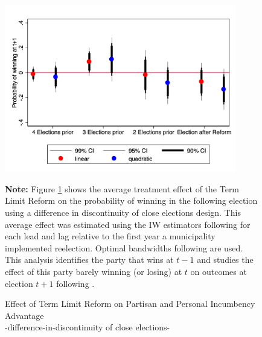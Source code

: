 \documentclass[12pt]{amsart}
\numberwithin{equation}{section}
\theoremstyle{definition}
\theoremstyle{definition}
\theoremstyle{definition}
\begin{document}
 \begin{figure}[H]   
\centering
 \caption{Effect of Term Limit Reform on Partisan and Personal Incumbency Advantage \\ -difference-in-discontinuity of close elections-}
 \label{fig:parallel_trend}
\includegraphics[width=0.9\textwidth]{../Figures/parallel_trends_incumbency.png}
       \captionsetup{justification=centering}
         
 \textbf{Note:} Figure \ref{fig:parallel_trend} shows the average treatment effect of the Term Limit Reform on the probability of winning in the following election using a difference in discontinuity of close elections design. This average effect was estimated using the IW estimators following \citet{abraham_sun_2020} for each lead and lag relative to the first year a municipality implemented reelection. Optimal bandwidths following \citet{calonicoetal_2014} are used. This analysis identifies the party that wins at $t-1$ and studies the effect of this party barely winning (or losing) at $t$ on outcomes at election $t+1$ following \citet{klasnja_titiunik_2017}.  
 
\end{figure}  
\end{document}
